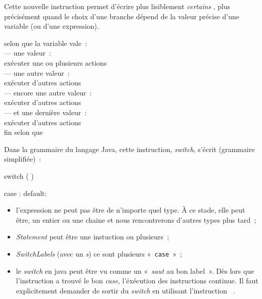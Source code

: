 	Cette nouvelle instruction permet d’écrire plus lisiblement \emph{certains}
	, plus précisément quand le choix d’une branche dépend
	de la valeur précise d’une variable (ou d’une expression).

	\begin{langagenaturel}
		selon que la variable vale~:\\
			\tab — une valeur~:\\
				\tab\tab exécuter une ou plusieurs actions\\
			\tab — une autre valeur~:\\
				\tab\tab exécuter d'autres actions\\
			\tab — encore une autre valeur~:\\
				\tab\tab exécuter d'autres actions\\
			\tab — et une dernière valeur~:\\
				\tab\tab exécuter d'autres actions\\
		fin selon que 
	\end{langagenaturel}

	Dans la grammaire  du langage Java, cette instruction, \textit{switch}, 
	s'écrit (grammaire simplifiée)~:

	\begin{grammaire}
		    switch (  ) 


		    case :
		    default:
	\end{grammaire}
	
	\begin{itemize}
		\item l'expression ne peut pas être de n'importe quel type. À ce stade, 
			elle peut être, un entier ou une chaine et nous rencontrerons 
			d'autres types plus tard~;
		\item \textit{Statement} peut être une instuction ou plusieurs~;
		\item \textit{SwitchLabels} (avec un \textit{s}) ce sont plusieurs 
			«~\texttt{case}~»~;
		\item le \textit{switch} en java peut être vu comme un «~\textit{saut}
			au bon label~». Dès lors que l'instruction a trouvé le bon
			\textit{case}, l'éxécution des instructions continue. Il faut
			explicitement demander de sortir du \textit{switch} en utilisant
			l'instruction \textbf{}~.
	\end{itemize}

